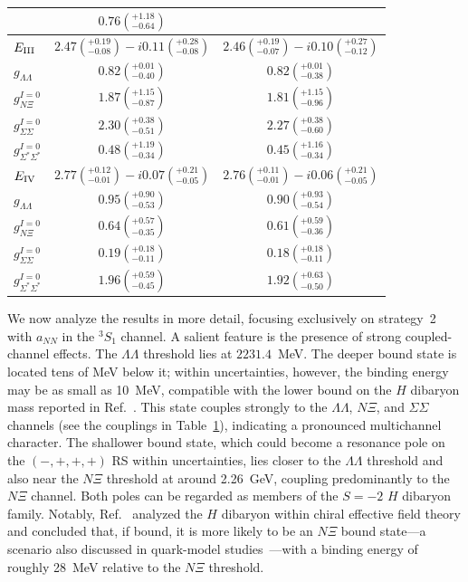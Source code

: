 \documentclass[prl,showpacs,twocolumn,superscriptaddress,floatfix,10pt,footinbib]{revtex4-2}
\begin{document}
\begin{table}[tb]
\begin{tabular}{p{2em}cc}
& $0.76\left(^{+1.18}_{-0.64}\right)$ \\
\midrule
$E_{\rm III}$
& $2.47\left(^{+0.19}_{-0.08}\right)-i0.11\left(^{+0.28}_{-0.08}\right)$
& $2.46\left(^{+0.19}_{-0.07}\right)-i0.10\left(^{+0.27}_{-0.12}\right)$ \\[5pt]
$g_{\Lambda\Lambda}$
& $0.82\left(^{+0.01}_{-0.40}\right)$
& $0.82\left(^{+0.01}_{-0.38}\right)$ \\[5pt]
$g_{N\Xi}^{I=0}$
& $1.87\left(^{+1.15}_{-0.87}\right)$
& $1.81\left(^{+1.15}_{-0.96}\right)$ \\[5pt]
$g_{\Sigma\Sigma}^{I=0}$
& $2.30\left(^{+0.38}_{-0.51}\right)$
& $2.27\left(^{+0.38}_{-0.60}\right)$ \\[5pt]
$g_{\Sigma^*\Sigma^*}^{I=0}$
& $0.48\left(^{+1.19}_{-0.34}\right)$
& $0.45\left(^{+1.16}_{-0.34}\right)$ \\
\midrule
$E_{\rm IV}$
& $2.77\left(^{+0.12}_{-0.01}\right)-i0.07\left(^{+0.21}_{-0.05}\right)$
& $2.76\left(^{+0.11}_{-0.01}\right)-i0.06\left(^{+0.21}_{-0.05}\right)$ \\[5pt]
$g_{\Lambda\Lambda}$
& $0.95\left(^{+0.90}_{-0.53}\right)$
& $0.90\left(^{+0.93}_{-0.54}\right)$ \\[5pt]
$g_{N\Xi}^{I=0}$
& $0.64\left(^{+0.57}_{-0.35}\right)$
& $0.61\left(^{+0.59}_{-0.36}\right)$ \\[5pt]
$g_{\Sigma\Sigma}^{I=0}$
& $0.19\left(^{+0.18}_{-0.11}\right)$
& $0.18\left(^{+0.18}_{-0.11}\right)$ \\[5pt]
$g_{\Sigma^*\Sigma^*}^{I=0}$
& $1.96\left(^{+0.59}_{-0.45}\right)$
& $1.92\left(^{+0.63}_{-0.50}\right)$ \\
\bottomrule
\end{tabular}
\label{tab:ES2}
\end{table}

We now analyze the results in more detail, focusing exclusively on strategy~2 with $a_{NN}$ in the $^3S_1$ channel. A salient feature is the presence of strong coupled-channel effects. The $\Lambda\Lambda$ threshold lies at $2231.4$~MeV. The deeper bound state is located tens of MeV below it; within uncertainties, however, the binding energy may be as small as 10~MeV, compatible with the lower bound on the $H$ dibaryon mass reported in Ref.~\cite{Takahashi:2001nm}. This state couples strongly to the $\Lambda\Lambda$, $N\Xi$, and $\Sigma\Sigma$ channels (see the couplings in Table~\ref{tab:ES2}), indicating a pronounced multichannel character. The shallower bound state, which could become a resonance pole on the $(-,+,+,+)$ RS within uncertainties, lies closer to the $\Lambda\Lambda$ threshold and also near the $N\Xi$ threshold at around 2.26~GeV, coupling predominantly to the $N\Xi$ channel. Both poles can be regarded as members of the $S=-2$ $H$ dibaryon family. Notably, Ref.~\cite{Haidenbauer:2011ah} analyzed the $H$ dibaryon within chiral effective field theory and concluded that, if bound, it is more likely to be an $N\Xi$ bound state---a scenario also discussed in quark-model studies~\cite{Oka:1983ku, Nakamoto:1997gh}---with a binding energy of roughly 28~MeV relative to the $N\Xi$ threshold.
\end{document}
